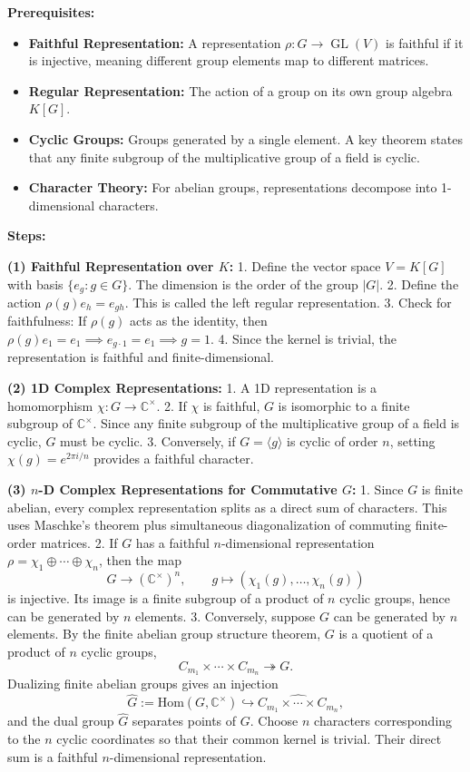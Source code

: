 \begin{solution}
\textbf{Prerequisites:}
\begin{itemize}
    \item \textbf{Faithful Representation:} A representation $\rho: G \to \operatorname{GL}(V)$ is faithful if it is injective, meaning different group elements map to different matrices.
    \item \textbf{Regular Representation:} The action of a group on its own group algebra $K[G]$.
    \item \textbf{Cyclic Groups:} Groups generated by a single element. A key theorem states that any finite subgroup of the multiplicative group of a field is cyclic.
    \item \textbf{Character Theory:} For abelian groups, representations decompose into 1-dimensional characters.
\end{itemize}

\textbf{Steps:}

\textbf{(1) Faithful Representation over $K$:}
1. Define the vector space $V = K[G]$ with basis $\{e_g : g \in G\}$. The dimension is the order of the group $|G|$.
2. Define the action $\rho(g) e_h = e_{gh}$. This is called the left regular representation.
3. Check for faithfulness: If $\rho(g)$ acts as the identity, then $\rho(g) e_1 = e_1 \implies e_{g \cdot 1} = e_1 \implies g = 1$.
4. Since the kernel is trivial, the representation is faithful and finite-dimensional.

\textbf{(2) 1D Complex Representations:}
1. A 1D representation is a homomorphism $\chi: G \to \mathbb{C}^\times$.
2. If $\chi$ is faithful, $G$ is isomorphic to a finite subgroup of $\mathbb{C}^\times$. Since any finite subgroup of the multiplicative group of a field is cyclic, $G$ must be cyclic.
3. Conversely, if $G = \langle g \rangle$ is cyclic of order $n$, setting $\chi(g) = e^{2\pi i/n}$ provides a faithful character.

\textbf{(3) $n$-D Complex Representations for Commutative $G$:}
1. Since $G$ is finite abelian, every complex representation splits as a direct sum of characters. This uses Maschke's theorem plus simultaneous diagonalization of commuting finite-order matrices.
2. If $G$ has a faithful $n$-dimensional representation $\rho=\chi_1\oplus\cdots\oplus\chi_n$, then the map
\[
G\longrightarrow(\mathbb{C}^{\times})^n,
\qquad
g\longmapsto(\chi_1(g),\ldots,\chi_n(g))
\]
is injective. Its image is a finite subgroup of a product of $n$ cyclic groups, hence can be generated by $n$ elements.
3. Conversely, suppose $G$ can be generated by $n$ elements. By the finite abelian group structure theorem, $G$ is a quotient of a product of $n$ cyclic groups,
\[
C_{m_1}\times\cdots\times C_{m_n}\twoheadrightarrow G.
\]
Dualizing finite abelian groups gives an injection
\[
\widehat{G}:=\mathrm{Hom}(G,\mathbb{C}^{\times})
\hookrightarrow
\widehat{C_{m_1}\times\cdots\times C_{m_n}},
\]
and the dual group $\widehat{G}$ separates points of $G$. Choose $n$ characters corresponding to the $n$ cyclic coordinates so that their common kernel is trivial. Their direct sum is a faithful $n$-dimensional representation.


\end{solution}
